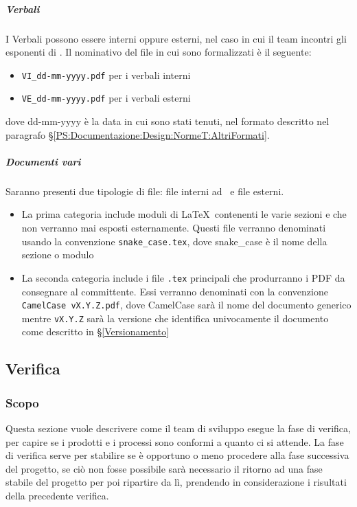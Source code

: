 			\subparagraph{Verbali}	\label{NomenclaturaVerbali}
			I Verbali  possono essere interni oppure esterni, nel caso in cui il team incontri gli esponenti di \II.
			Il nominativo del file in cui sono formalizzati è il seguente:
			\begin{itemize}
				\item \texttt{VI\_dd-mm-yyyy.pdf} per i verbali interni
				\item \texttt{VE\_dd-mm-yyyy.pdf} per i verbali esterni
			\end{itemize}
			dove dd-mm-yyyy è la data in cui sono stati tenuti, nel formato descritto nel paragrafo \S\ref{PS:Documentazione:Design:NormeT:AltriFormati}.

			\subparagraph{Documenti vari}
			Saranno presenti due tipologie di file: file interni ad \gruppo\ e file esterni.
			\begin{itemize}
				\item La prima categoria include moduli di \LaTeX\ contenenti le varie sezioni e che non verranno mai esposti esternamente. Questi file verranno	denominati usando la convenzione \texttt{snake\_case.tex}, dove snake\_case è il nome della sezione o modulo
				\item La seconda categoria include i file \texttt{.tex} principali che produrranno i PDF da consegnare al committente. Essi verranno denominati con la convenzione \mbox{\texttt{CamelCase vX.Y.Z.pdf}}, dove CamelCase sarà il nome del documento generico mentre \texttt{vX.Y.Z} sarà la versione che identifica univocamente il documento come descritto in \S\ref{Versionamento}
			\end{itemize}

	\subsection{Verifica}

		\subsubsection{Scopo}
		Questa sezione vuole descrivere come il team di sviluppo esegue la fase di verifica, per capire se i prodotti e i processi sono conformi a quanto ci si attende.
		La fase di verifica serve per stabilire se è opportuno o meno procedere alla fase successiva del progetto, se ciò non fosse possibile sarà necessario il
		ritorno ad una fase stabile del progetto per poi ripartire da lì, prendendo in considerazione i risultati della precedente verifica.

